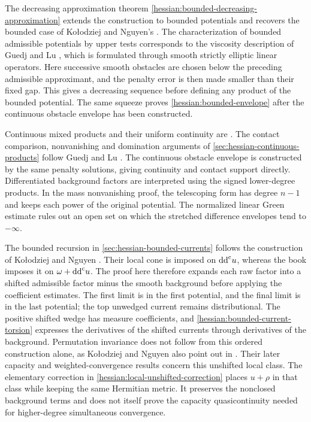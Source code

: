 The decreasing approximation theorem
\cref{hessian:bounded-decreasing-approximation} extends the construction
to bounded potentials and recovers the bounded case of Ko{\l}odziej
and Nguyen's \cite[arXiv~v2, Lemma~3.20, p.~25]{KNHessian16}.
The characterization of bounded admissible potentials by upper tests
corresponds to the viscosity description of Guedj and Lu
\cite[arXiv~v1, Section~1.1.1, pp.~3--4]{GLHessian25}, which is
formulated through smooth strictly elliptic linear operators.
Here successive smooth obstacles are
chosen below the preceding admissible approximant, and the penalty error
is then made smaller than their fixed gap. This gives a decreasing
sequence before defining any product of the bounded potential.
The same squeeze proves \cref{hessian:bounded-envelope} after the
continuous obstacle envelope has been constructed.

Continuous mixed products and their uniform continuity are
\cite[arXiv~v2, Proposition~2.11 and Corollary~2.12, pp.~10--11]{KNHessian16}.
The contact comparison, nonvanishing and domination arguments of
\cref{sec:hessian-continuous-products} follow Guedj and Lu
\cite[arXiv~v1, Lemma~1.10, Theorems~2.1--2.2 and Corollaries~2.3--2.4,
pp.~6--7 and~8--9]{GLHessian25}.
The continuous obstacle envelope is constructed by the same penalty
solutions, giving continuity and contact support directly. Differentiated
background factors are interpreted using the signed lower-degree
products. In the mass nonvanishing proof, the telescoping form has degree
$n-1$ and keeps each power of the original potential. The normalized
linear Green estimate rules out an open set on which the stretched
difference envelopes tend to $-\infty$.

The bounded recursion in \cref{sec:hessian-bounded-currents} follows the
construction of Ko{\l}odziej and Nguyen
\cite[Lemmas~3.1--3.2, Theorem~3.3 and Proposition~3.7,
pp.~125--129]{KNHermitianMeasures26}. Their local cone is imposed on
$\mathrm{dd}^{\mathrm{c}} u$, whereas the book imposes it on $\omega+\mathrm{dd}^{\mathrm{c}} u$. The proof here
therefore expands each raw factor into a shifted admissible factor
minus the smooth background before applying the coefficient estimates.
The first limit is in the first potential, and the final limit is in
the last potential; the top unwedged current remains distributional.
The positive shifted wedge has measure coefficients, and
\cref{hessian:bounded-current-torsion} expresses the derivatives of
the shifted currents through derivatives of the background.
Permutation invariance does not follow from this ordered construction
alone, as Ko{\l}odziej and Nguyen also point out in
\cite[Remark~3.6, p.~128]{KNHermitianMeasures26}. Their later
capacity and weighted-convergence results concern this unshifted local
class. The elementary
correction in \cref{hessian:local-unshifted-correction} places $u+\rho$
in that class while keeping the same Hermitian metric. It preserves the
nonclosed background terms and does not itself prove the capacity
quasicontinuity needed for higher-degree simultaneous convergence.


